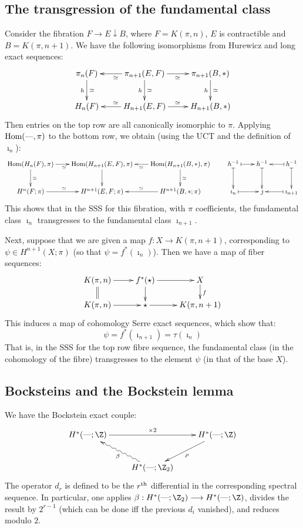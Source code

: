\documentclass[11pt]{article}
\newcommand{\Hom}{\textup{Hom}}
\newcommand{\DASH}{\textup{---}}
\theoremstyle{plain}
\theoremstyle{definition}
\renewcommand{\to}{\longrightarrow}
\begin{document}
\setcounter{subsection}{1}
\subsection{The transgression of the fundamental class}
Consider  the fibration $F\rightarrow E\downarrow B$, where $F=K(\pi,n)$, $E$ is contractible and $B=K(\pi,n+1)$. We have the following isomorphisms from Hurewicz and long exact sequences:%
\[\xymatrix{
\pi_n(F)\ar[d]_h^\simeq&\pi_{n+1}(E,F)\ar[d]_h^\simeq\ar[l]^\simeq\ar[r]_\simeq&\pi_{n+1}(B,*)\ar[d]_h^\simeq\\
H_n(F)&H_{n+1}(E,F)\ar[l]_\simeq\ar[r]^\simeq&H_{n+1}(B,*)
}\]
Then entries on the top row are all canonically isomorphic to $\pi$. Applying $\Hom(\DASH,\pi)$ to the bottom row, we obtain (using the UCT and the definition of $\imath_n$):
\[\xymatrix@C=.7cm{
\Hom(H_n(F),\pi)\ar[d]^\simeq\ar[r]_{\simeq\ \ }&
\Hom(H_{n+1}(E,F),\pi)\ar[d]&
\Hom(H_{n+1}(B,*),\pi)\ar[d]^\simeq\ar[l]^\simeq&
h^{-1}\ar@{|->}[r]\ar@{|->}[d]&
h^{-1}\ar@{|->}[d]&
h^{-1}\ar@{|->}[l]\ar@{|->}[d]\\
H^n(F;\pi)\ar[r]^{\simeq\ \ }&H^{n+1}(E,F;\pi)&H^{n+1}(B,*;\pi)\ar[l]_\simeq&
\imath_n\ar@{|->}[r]&\jmath&\imath_{n+1}\ar@{|->}[l]
}\]
This shows that in the SSS for this fibration, with $\pi$ coefficients, the fundamental class $\imath_n$ transgresses to the fundamental class $\imath_{n+1}$.

Next, suppose that we are given a map $f:X\to K(\pi,n+1)$, corresponding to $\psi\in H^{n+1}(X;\pi)$ (so that $\psi=f^*(\imath_n)$). Then we have a map of fiber sequences:
\[\xymatrix@R=5mm{
K(\pi,n)\ar[r]\ar@{=}[d]&f^*(\star)\ar[d]\ar[r]&X\ar[d]^f\\
K(\pi,n)\ar[r]&\star\ar[r]&K(\pi,n+1)
}\]
This induces a map of cohomology Serre exact sequences, which show that:
\begin{equation*}
\tag{Formula 1}\psi=f^*(\imath_{n+1})=\tau(\imath_n)
\end{equation*}
That is, in the SSS for the top row fibre sequence, the fundamental class (in the cohomology of the fibre) transgresses to the element $\psi$ (in that of the base $X$).

\subsection{Bocksteins and the Bockstein lemma}
We have the Bockstein exact couple:
\[\xymatrix{
H^*(\DASH;\Z)\ar[rr]^{\times2}&&H^*(\DASH;\Z)\ar[dl]^\rho\\
&H^*(\DASH;\Z_2)\ar@{~>}[ul]^{\beta}
}\]
The operator $d_r$ is defined to be the $r^\textup{th}$ differential in the corresponding spectral sequence. In particular, one applies $\beta:H^*(\DASH;\Z_2)\to H^*(\DASH;\Z)$, divides the result by $2^{r-1}$ (which can be done iff the previous $d_i$ vanished), and reduces modulo $2$.
\end{document}
